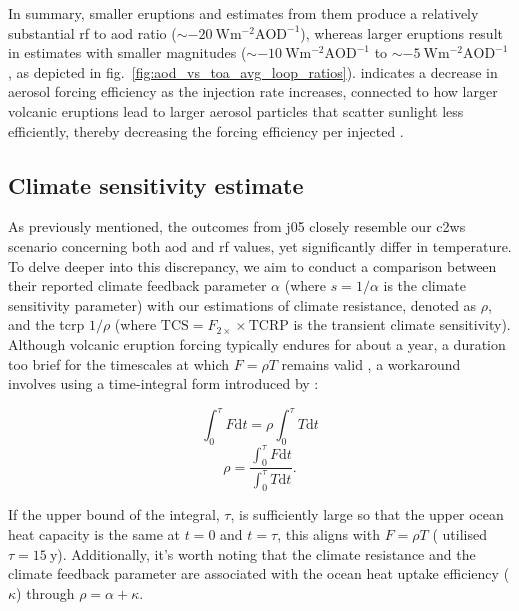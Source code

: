 \documentclass{ametsocV6.1}
\newcommand{\iso}[1][i]{{#1}njected \ce{SO2}}
\begin{document}
In summary, smaller eruptions and estimates from them produce a relatively substantial
\gls{rf} to \gls{aod} ratio (\(\sim \SI{-20}{\watt\metre^{-2}\mathrm{AOD}^{-1}}\)),
whereas larger eruptions result in estimates with smaller magnitudes (\(\sim
\SI{-10}{\watt\metre^{-2}\mathrm{AOD}^{-1}}\) to \(\sim
\SI{-5}{\watt\metre^{-2}\mathrm{AOD}^{-1}}\), as depicted in
fig.~\ref{fig:aod_vs_toa_avg_loop_ratios}). \citet{niemeier2017} indicates a decrease in
aerosol forcing efficiency as the injection rate increases, connected to how larger
volcanic eruptions lead to larger aerosol particles that scatter sunlight less
efficiently, thereby decreasing the forcing efficiency per \iso{} \citep{english2013,
  timmreck2018}.

\subsection{Climate sensitivity estimate}

As previously mentioned, the outcomes from \gls{j05} closely resemble our \gls{c2ws}
scenario concerning both \gls{aod} and \gls{rf} values, yet significantly differ in
temperature. To delve deeper into this discrepancy, we aim to conduct a comparison
between their reported climate feedback parameter \(\alpha \) (where \(s=1/\alpha \) is
the climate sensitivity parameter) with our estimations of climate resistance, denoted
as \(\rho \), and the \gls{tcrp} \(1/\rho\) (where \(\mathrm{TCS}=F_{2\times}\times
\mathrm{TCRP}\) is the transient climate sensitivity). Although volcanic eruption
forcing typically endures for about a year, a duration too brief for the timescales at
which \(F=\rho T\) remains valid \citep{gregory2016}, a workaround involves using a
time-integral form introduced by \citet{merlis2014}:

\begin{equation}
  \int_0^{\tau}F \mathrm{d}t=\rho\int_{0}^{\tau}T \mathrm{d}t
\end{equation}
\begin{equation}
  \rho=\frac{\int_0^{\tau}F \mathrm{d}t}{\int_{0}^{\tau}T \mathrm{d}t}.
  \label{eq:climate-resistance}
\end{equation}

If the upper bound of the integral, \(\tau \), is sufficiently large so that the upper
ocean heat capacity is the same at \(t=0\) and \(t=\tau \), this aligns with \(F=\rho
T\) \citep{gregory2016} (\citet{merlis2014} utilised \(\tau =\SI{15}{\mathrm{y}}\)).
Additionally, it's worth noting that the climate resistance and the climate feedback
parameter are associated with the ocean heat uptake efficiency (\(\kappa \)) through
\(\rho =\alpha +\kappa \).
\end{document}

